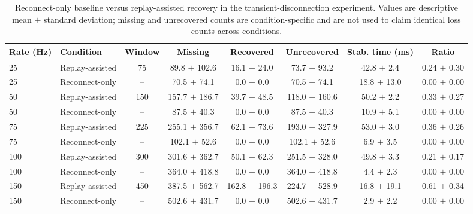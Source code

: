 \begin{table}[t]
\centering
\caption{Reconnect-only baseline versus replay-assisted recovery in the transient-disconnection experiment. Values are descriptive mean $\pm$ standard deviation; missing and unrecovered counts are condition-specific and are not used to claim identical loss counts across conditions.}
\label{tab:reconnect_only_vs_replay}
\scriptsize
\begin{tabular}{llcccccc}
\hline
Rate (Hz) & Condition & Window & Missing & Recovered & Unrecovered & Stab. time (ms) & Ratio \\
\hline
25 & Replay-assisted & 75 & 89.8 $\pm$ 102.6 & 16.1 $\pm$ 24.0 & 73.7 $\pm$ 93.2 & 42.8 $\pm$ 2.4 & 0.24 $\pm$ 0.30 \\
25 & Reconnect-only & -- & 70.5 $\pm$ 74.1 & 0.0 $\pm$ 0.0 & 70.5 $\pm$ 74.1 & 18.8 $\pm$ 13.0 & 0.00 $\pm$ 0.00 \\
50 & Replay-assisted & 150 & 157.7 $\pm$ 186.7 & 39.7 $\pm$ 48.5 & 118.0 $\pm$ 160.6 & 50.2 $\pm$ 2.2 & 0.33 $\pm$ 0.27 \\
50 & Reconnect-only & -- & 87.5 $\pm$ 40.3 & 0.0 $\pm$ 0.0 & 87.5 $\pm$ 40.3 & 10.9 $\pm$ 5.1 & 0.00 $\pm$ 0.00 \\
75 & Replay-assisted & 225 & 255.1 $\pm$ 356.7 & 62.1 $\pm$ 73.6 & 193.0 $\pm$ 327.9 & 53.0 $\pm$ 3.0 & 0.36 $\pm$ 0.26 \\
75 & Reconnect-only & -- & 102.1 $\pm$ 52.6 & 0.0 $\pm$ 0.0 & 102.1 $\pm$ 52.6 & 6.9 $\pm$ 3.5 & 0.00 $\pm$ 0.00 \\
100 & Replay-assisted & 300 & 301.6 $\pm$ 362.7 & 50.1 $\pm$ 62.3 & 251.5 $\pm$ 328.0 & 49.8 $\pm$ 3.3 & 0.21 $\pm$ 0.17 \\
100 & Reconnect-only & -- & 364.0 $\pm$ 418.8 & 0.0 $\pm$ 0.0 & 364.0 $\pm$ 418.8 & 4.4 $\pm$ 2.3 & 0.00 $\pm$ 0.00 \\
150 & Replay-assisted & 450 & 387.5 $\pm$ 562.7 & 162.8 $\pm$ 196.3 & 224.7 $\pm$ 528.9 & 16.8 $\pm$ 19.1 & 0.61 $\pm$ 0.34 \\
150 & Reconnect-only & -- & 502.6 $\pm$ 431.7 & 0.0 $\pm$ 0.0 & 502.6 $\pm$ 431.7 & 2.9 $\pm$ 2.2 & 0.00 $\pm$ 0.00 \\
\hline
\end{tabular}
\end{table}